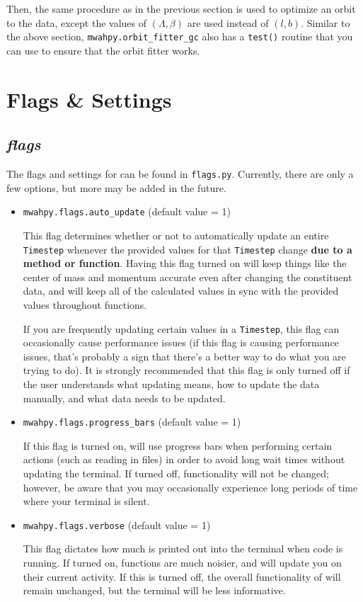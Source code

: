 \documentclass{article}
\begin{document}
Then, the same procedure as in the previous section is used to optimize an orbit to the data, except the values of $(\Lambda, \beta)$ are used instead of $(l, b)$. Similar to the above section, \verb!mwahpy.orbit_fitter_gc! also has a \verb!test()! routine that you can use to ensure that the orbit fitter works. 

\newpage

\section{Flags \& Settings}

\subsection{\textit{flags}}

The flags and settings for \mwahpy can be found in \verb!flags.py!. Currently, there are only a few options, but more may be added in the future. 

\begin{itemize}

\item \verb!mwahpy.flags.auto_update! (default value = 1)

This flag determines whether or not to automatically update an entire \verb!Timestep! whenever the provided values for that \verb!Timestep! change \textbf{due to a \mwahpy method or function}. Having this flag turned on will keep things like the center of mass and momentum accurate even after changing the constituent data, and will keep all of the calculated values in sync with the provided values throughout \mwahpy functions. 

If you are frequently updating certain values in a \verb!Timestep!, this flag can occasionally cause performance issues (if this flag is causing performance issues, that's probably a sign that there's a better way to do what you are trying to do). It is strongly recommended that this flag is only turned off if the user understands what updating means, how to update the data manually, and what data needs to be updated. 

\item \verb!mwahpy.flags.progress_bars! (default value = 1)

If this flag is turned on, \mwahpy will use progress bars when performing certain actions (such as reading in files) in order to avoid long wait times without updating the terminal. If turned off, \mwahpy functionality will not be changed; however, be aware that you may occasionally experience long periods of time where your terminal is silent.

\item \verb!mwahpy.flags.verbose! (default value = 1)

This flag dictates how much is printed out into the terminal when \mwahpy code is running. If turned on, functions are much noisier, and will update you on their current activity. If this is turned off, the overall functionality of \mwahpy will remain unchanged, but the terminal will be less informative. 

\end{itemize}
\end{document}
